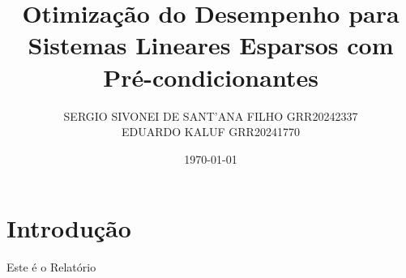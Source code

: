 \documentclass[11pt]{article}
\title{Otimização do Desempenho para Sistemas Lineares Esparsos com Pré-condicionantes}
\author{SERGIO SIVONEI DE SANT'ANA FILHO GRR20242337\\EDUARDO KALUF GRR20241770}
\date{\today}
\begin{document}
    \maketitle

    \section{Introdução}\label{sec:introducao}

    Este é o Relatório
\end{document}

